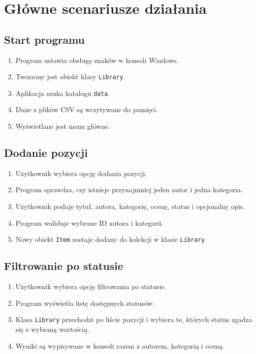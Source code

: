 \documentclass[12pt,a4paper]{article}
\begin{document}
\section{Główne scenariusze działania}

\subsection{Start programu}

\begin{enumerate}
    \item Program ustawia obsługę znaków w konsoli Windows.
    \item Tworzony jest obiekt klasy \texttt{Library}.
    \item Aplikacja szuka katalogu \texttt{data}.
    \item Dane z plików CSV są wczytywane do pamięci.
    \item Wyświetlane jest menu główne.
\end{enumerate}

\subsection{Dodanie pozycji}

\begin{enumerate}
    \item Użytkownik wybiera opcję dodania pozycji.
    \item Program sprawdza, czy istnieje przynajmniej jeden autor i jedna kategoria.
    \item Użytkownik podaje tytuł, autora, kategorię, ocenę, status i opcjonalny opis.
    \item Program waliduje wybrane ID autora i kategorii.
    \item Nowy obiekt \texttt{Item} zostaje dodany do kolekcji w klasie \texttt{Library}.
\end{enumerate}

\subsection{Filtrowanie po statusie}

\begin{enumerate}
    \item Użytkownik wybiera opcję filtrowania po statusie.
    \item Program wyświetla listę dostępnych statusów.
    \item Klasa \texttt{Library} przechodzi po liście pozycji i wybiera te, których status
    zgadza się z wybraną wartością.
    \item Wyniki są wypisywane w konsoli razem z autorem, kategorią i oceną.
\end{enumerate}
\end{document}
